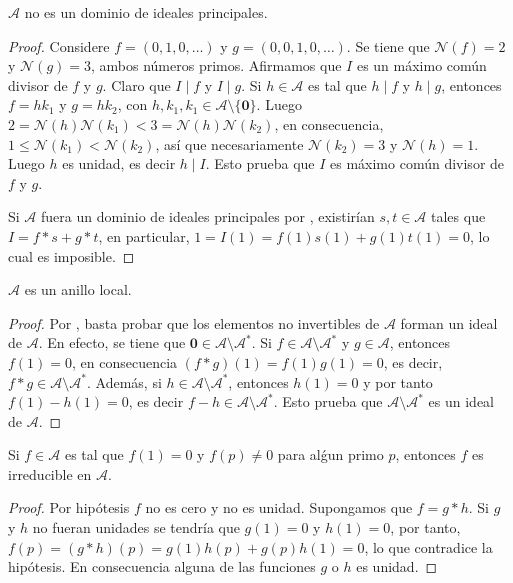 \begin{proposition}
$\mathcal{A}$ no es un dominio de ideales principales.
\end{proposition}
\begin{proof}
Considere $f=(0,1,0,\ldots)$ y $g=(0,0,1,0,\ldots)$. Se tiene que $\mathcal{N}(f)=2$ y $\mathcal{N}(g)=3$, ambos números primos. Afirmamos que $I$ es un máximo común divisor de $f$ y $g$. Claro que $I \mid f$ y $I \mid g$. Si $h \in \mathcal{A}$ es tal que $h \mid f$ y $h \mid g$, entonces $f=h k_1$ y $g=h k_2$, con $h,k_1,k_1 \in \mathcal{A}\setminus \{ \mathbf{0} \}$. Luego $2=\mathcal{N}(h)\mathcal{N}(k_1)<3=\mathcal{N}(h)\mathcal{N}(k_2)$, en consecuencia, $1 \le \mathcal{N}(k_1)<\mathcal{N}(k_2)$, así que necesariamente $\mathcal{N}(k_2)=3$ y $\mathcal{N}(h)=1$. Luego $h$ es unidad, es decir $h \mid I$. Esto prueba que $I$ es máximo común divisor de $f$ y $g$.
\bigskip

Si $\mathcal{A}$ fuera un dominio de ideales principales por \cite[\S III.3, Thm. 3.11.(ii), p. 140]{Hun1}, existirían $s,t \in \mathcal{A}$ tales que $I=f*s+g*t$, en particular, $1=I(1)=f(1)s(1)+g(1)t(1)=0$, lo cual es imposible.
\end{proof}

\begin{theorem}
$\mathcal{A}$ es un anillo local.
\end{theorem}
\begin{proof}
Por \cite[\S III.4, Thm. 4.13.(iii), p. 147]{Hun1}, basta probar que los elementos no invertibles de $\mathcal{A}$ forman un ideal de $\mathcal{A}$. En efecto, se tiene que $\mathbf{0} \in \mathcal{A}\setminus \mathcal{A}^*$. Si $f \in \mathcal{A}\setminus \mathcal{A}^*$ y $g \in \mathcal{A}$, entonces $f(1)=0$, en consecuencia $(f*g)(1)=f(1)g(1)=0$, es decir, $f*g \in \mathcal{A}\setminus \mathcal{A}^*$. Además, si $h \in \mathcal{A}\setminus \mathcal{A}^*$, entonces $h(1)=0$ y por tanto $f(1)-h(1)=0$, es decir $f-h \in \mathcal{A}\setminus \mathcal{A}^*$. Esto prueba que $\mathcal{A}\setminus \mathcal{A}^*$ es un ideal de $\mathcal{A}$.
\end{proof}

\begin{proposition}
Si $f \in \mathcal{A}$ es tal que $f(1) = 0$ y $f(p) \ne 0$ para alǵun primo $p$, entonces $f$ es irreducible en $\mathcal{A}$.
\end{proposition}
\begin{proof}
Por hipótesis $f$ no es cero y no es unidad. Supongamos que $f=g*h$. Si $g$ y $h$ no fueran unidades se tendría que $g(1)=0$ y $h(1)=0$, por tanto, $f(p)=(g*h)(p)=g(1)h(p)+g(p)h(1)=0$, lo que contradice la hipótesis. En consecuencia alguna de las funciones $g$ o $h$ es unidad.
\end{proof}

